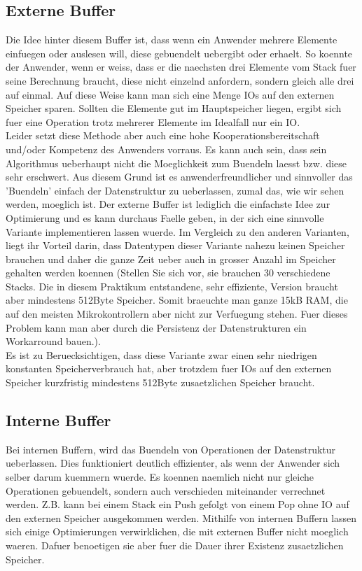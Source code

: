 \documentclass[10pt,a4paper]{article}
\begin{document}
\subsection{Externe Buffer}
Die Idee hinter diesem Buffer ist, dass wenn ein Anwender mehrere Elemente einfuegen oder auslesen will, diese gebuendelt uebergibt oder erhaelt. So koennte der Anwender, wenn er weiss, dass er die naechsten drei Elemente vom Stack fuer seine Berechnung braucht, diese nicht einzelnd anfordern, sondern gleich alle drei auf einmal. Auf diese Weise kann man sich eine Menge IOs auf den externen Speicher sparen. Sollten die Elemente gut im Hauptspeicher liegen, ergibt sich fuer eine Operation trotz mehrerer Elemente im Idealfall nur ein IO.\\
Leider setzt diese Methode aber auch eine hohe Kooperationsbereitschaft und/oder Kompetenz des Anwenders vorraus. Es kann auch sein, dass sein Algorithmus ueberhaupt nicht die Moeglichkeit zum Buendeln laesst bzw. diese sehr erschwert. Aus diesem Grund ist es anwenderfreundlicher und sinnvoller das 'Buendeln' einfach der Datenstruktur zu ueberlassen, zumal das, wie wir sehen werden, moeglich ist. Der externe Buffer ist lediglich die einfachste Idee zur Optimierung und es kann durchaus Faelle geben, in der sich eine sinnvolle Variante implementieren lassen wuerde. Im Vergleich zu den anderen Varianten, liegt ihr Vorteil darin, dass Datentypen dieser Variante nahezu keinen Speicher brauchen und daher die ganze Zeit ueber auch in grosser Anzahl im Speicher gehalten werden koennen (Stellen Sie sich vor, sie brauchen 30 verschiedene Stacks. Die in diesem Praktikum entstandene, sehr effiziente, Version braucht aber mindestens 512Byte Speicher. Somit braeuchte man ganze 15kB RAM, die auf den meisten Mikrokontrollern aber nicht zur Verfuegung stehen. Fuer dieses Problem kann man aber durch die Persistenz der Datenstrukturen ein Workarround bauen.). \\
Es ist zu Beruecksichtigen, dass diese Variante zwar einen sehr niedrigen konstanten Speicherverbrauch hat, aber trotzdem fuer IOs auf den externen Speicher kurzfristig mindestens 512Byte zusaetzlichen Speicher braucht. 

\subsection{Interne Buffer}
Bei internen Buffern, wird das Buendeln von Operationen der Datenstruktur ueberlassen. Dies funktioniert deutlich effizienter, als wenn der Anwender sich selber darum kuemmern wuerde. Es koennen naemlich nicht nur gleiche Operationen gebuendelt, sondern auch verschieden miteinander verrechnet werden. Z.B. kann bei einem Stack ein Push gefolgt von einem Pop ohne IO auf den externen Speicher ausgekommen werden. Mithilfe von internen Buffern lassen sich einige Optimierungen verwirklichen, die mit externen Buffer nicht moeglich waeren. Dafuer benoetigen sie aber fuer die Dauer ihrer Existenz zusaetzlichen Speicher.
\end{document}
